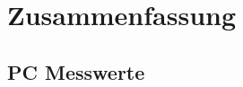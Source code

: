 \FloatBarrier
\section{Zusammenfassung}


\FloatBarrier
\begin{appendix}
    \section{PC Messwerte}
    \label{sec:pc_messwerte}

%
%
%
%
%


\end{appendix}
